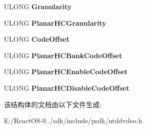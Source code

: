 \begin{DoxyCompactItemize}
\item 
\mbox{\label{struct___v_i_d_e_o___b_a_n_k___s_e_l_e_c_t_aba0d31246ac52e678e4858dd3a0bffcd}} 
U\+L\+O\+NG {\bfseries Granularity}
\item 
\mbox{\label{struct___v_i_d_e_o___b_a_n_k___s_e_l_e_c_t_ad770c7f4ada9ed1130f6220ddbaf595d}} 
U\+L\+O\+NG {\bfseries Planar\+H\+C\+Granularity}
\item 
\mbox{\label{struct___v_i_d_e_o___b_a_n_k___s_e_l_e_c_t_a6ef6164a1384bd84363de83426c849dc}} 
U\+L\+O\+NG {\bfseries Code\+Offset}
\item 
\mbox{\label{struct___v_i_d_e_o___b_a_n_k___s_e_l_e_c_t_aefea4e77977d746ecada928053f4444c}} 
U\+L\+O\+NG {\bfseries Planar\+H\+C\+Bank\+Code\+Offset}
\item 
\mbox{\label{struct___v_i_d_e_o___b_a_n_k___s_e_l_e_c_t_a0789136927fbaee898f938821d18044d}} 
U\+L\+O\+NG {\bfseries Planar\+H\+C\+Enable\+Code\+Offset}
\item 
\mbox{\label{struct___v_i_d_e_o___b_a_n_k___s_e_l_e_c_t_a3567bb43a341e2a1de21e143180c0a2d}} 
U\+L\+O\+NG {\bfseries Planar\+H\+C\+Disable\+Code\+Offset}
\end{DoxyCompactItemize}


该结构体的文档由以下文件生成\+:\begin{DoxyCompactItemize}
\item 
E\+:/\+React\+O\+S-\/0../sdk/include/psdk/ntddvdeo.\+h\end{DoxyCompactItemize}
